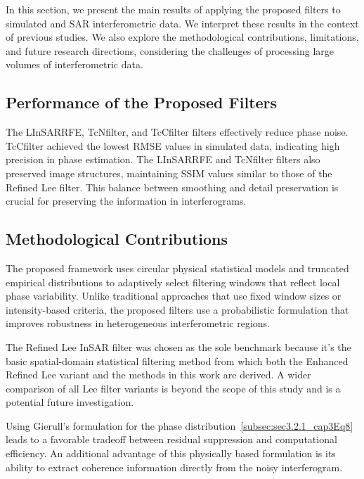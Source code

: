 \documentclass[remotesensing,article,submit,pdftex,moreauthors]{Definitions/mdpi}
\begin{document}
In this section, we present the main results of applying the proposed filters to simulated and SAR interferometric data. 
We interpret these results in the context of previous studies. 
We also explore the methodological contributions, limitations, and future research directions, considering the challenges of processing large volumes of interferometric data.

\subsection{Performance of the Proposed Filters}

The LInSARRFE, TcNfilter, and TcCfilter filters effectively reduce phase noise. 
TcCfilter achieved the lowest RMSE values in simulated data, indicating high precision in phase estimation. 
The LInSARRFE and TcNfilter filters also preserved image structures, maintaining SSIM values similar to those of the Refined Lee filter. 
This balance between smoothing and detail preservation is crucial for preserving the information in interferograms.

\subsection{Methodological Contributions}

The proposed framework uses circular physical statistical models and truncated empirical distributions to adaptively select filtering windows that reflect local phase variability. Unlike traditional approaches that use fixed window sizes or intensity-based criteria, the proposed filters use a probabilistic formulation that improves robustness in heterogeneous interferometric regions.

The Refined Lee InSAR filter was chosen as the sole benchmark because it’s the basic spatial-domain statistical filtering method from which both the Enhanced Refined Lee variant and the methods in this work are derived. A wider comparison of all Lee filter variants is beyond the scope of this study and is a potential future investigation.

Using Gierull's formulation for the phase distribution~\eqref{subsec:sec3.2.1_cap3Eq8} leads to a favorable tradeoff between residual suppression and computational efficiency. 
An additional advantage of this physically based formulation is its ability to extract coherence information directly from the noisy interferogram. 
\end{document}
